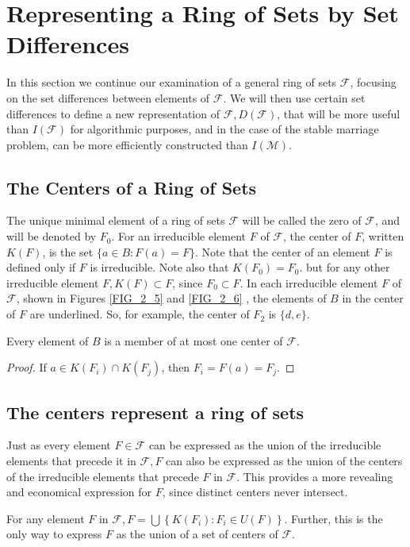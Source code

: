 \section{Representing a Ring of Sets by Set Differences}

In this section we continue our examination of a general ring of sets $\mathcal{F}$, focusing on the set differences between elements of $\mathcal{F}$. We will then use certain set differences to define a new representation of $\mathcal{F}, D(\mathcal{F})$, that will be more useful than $I(\mathcal{F})$ for algorithmic purposes, and in the case of the stable marriage problem, can be more efficiently constructed than $I(\mathcal{M})$.

\subsection{The Centers of a Ring of Sets}

The unique minimal element of a ring of sets $\mathcal{F}$ will be called the zero of $\mathcal{F}$, and will be denoted by $F_0$. For an irreducible element $F$ of $\mathcal{F}$, the center of $F$, written $K(F)$, is the set $\{a \in B: F(a)=F\}$. Note that the center of an element $F$ is defined only if $F$ is irreducible. Note also that $K\left(F_0\right)=F_0$. but for any other irreducible element $F, K(F) \subset F$, since $F_0 \subset F$. In each irreducible element $F$ of $\mathcal{F}$, shown in Figures \ref{FIG_2_5} and \ref{FIG_2_6} , the elements of $B$ in the center of $F$ are underlined. So, for example, the center of $F_2$ is $\{d, e\}$.

\begin{lemma}\label{lem_2_8}
 Every element of $B$ is a member of at most one center of $\mathcal{F}$.
\end{lemma}

\begin{proof}
    If $a \in K\left(F_i\right) \cap K\left(F_j\right)$, then $F_i=F(a)=F_j$.
\end{proof}

\subsection{The centers represent a ring of sets}
 
 Just as every element $F \in \mathcal{F}$ can be expressed as the union of the irreducible elements that precede it in $\mathcal{F}, F$ can also be expressed as the union of the centers of the irreducible elements that precede $F$ in $\mathcal{F}$. This provides a more revealing and economical expression for $F$, since distinct centers never intersect. 
\begin{lemma}\label{lem_2_9}
    For any element $F$ in $\mathcal{F}, F=\bigcup\left\{K\left(F_i\right): F_i \in U(F)\right\}$. Further, this is the only way to express $F$ as the union of a set of centers of $\mathcal{F}$.
\end{lemma}


